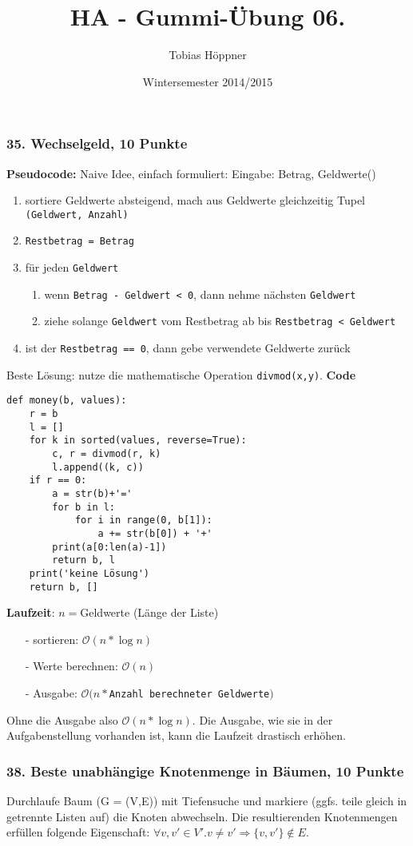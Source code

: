 \documentclass[ngerman,a4paper]{report}
\author{Tobias Höppner}
\title{HA - Gummi-Übung 06.}
\date{Wintersemester 2014/2015}
\renewcommand{\maketitle}{}
\begin{document}
 
\maketitle 

\subsubsection*{35. Wechselgeld, 10 Punkte}
\textbf{Pseudocode:} Naive Idee, einfach formuliert:
Eingabe: Betrag, Geldwerte()
\begin{enumerate}
\item sortiere Geldwerte absteigend, mach aus Geldwerte gleichzeitig Tupel \lstinline!(Geldwert, Anzahl)!
\item \lstinline!Restbetrag = Betrag!
\item für jeden \lstinline!Geldwert!
\begin{enumerate}
\item wenn \lstinline!Betrag - Geldwert < 0!, dann nehme nächsten \lstinline!Geldwert!
\item ziehe solange \lstinline!Geldwert! vom Restbetrag ab bis \lstinline!Restbetrag < Geldwert!
\end{enumerate}
\item ist der \lstinline!Restbetrag == 0!, dann gebe verwendete Geldwerte zurück
\end{enumerate}
Beste Lösung: nutze die mathematische Operation \lstinline!divmod(x,y)!. 
\textbf{Code}
\begin{lstlisting}
def money(b, values):
    r = b
    l = []
    for k in sorted(values, reverse=True):
        c, r = divmod(r, k)
        l.append((k, c))
    if r == 0:
        a = str(b)+'='
        for b in l:
            for i in range(0, b[1]):
                a += str(b[0]) + '+'
        print(a[0:len(a)-1])
        return b, l
    print('keine Lösung')
    return b, []
\end{lstlisting}
\textbf{Laufzeit}: $n = $Geldwerte (Länge der Liste)
\begin{enumerate}
\item[-] sortieren: $\mathcal{O}(n * \log n)$
\item[-] Werte berechnen: $\mathcal{O}(n)$
\item[-] Ausgabe: $\mathcal{O}(n * $\lstinline!Anzahl berechneter Geldwerte!$)$
\end{enumerate}
Ohne die Ausgabe also $\mathcal{O}(n * \log n)$. Die Ausgabe, wie sie in der Aufgabenstellung vorhanden ist, kann die Laufzeit drastisch erhöhen.\\
\subsubsection*{38. Beste unabhängige Knotenmenge in Bäumen, 10 Punkte}
Durchlaufe Baum (G = (V,E)) mit Tiefensuche und markiere (ggfs. teile gleich in getrennte Listen auf) die Knoten abwechseln. Die resultierenden Knotenmengen erfüllen folgende Eigenschaft: $\forall v, v' \in V'. v \neq v' \Rightarrow \{v,v' \} \notin E$.
\end{document}
